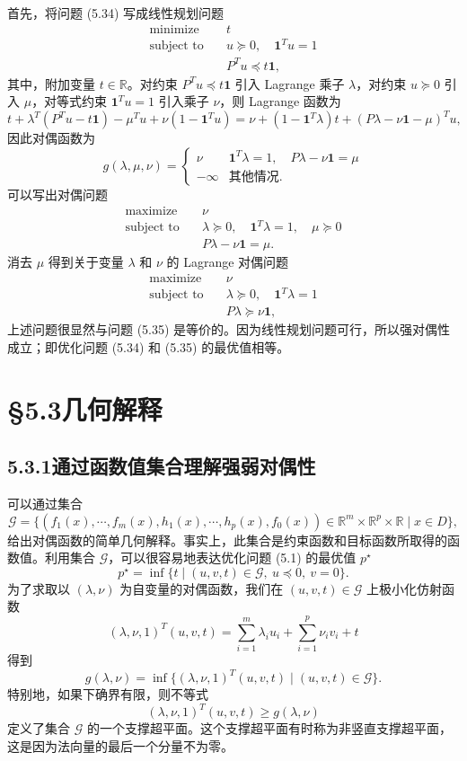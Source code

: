 \documentclass[UTF8, 12pt, fontset=fandol, oneside]{ctexart}
\begin{document}
首先，将问题 (5.34) 写成线性规划问题
\[
\begin{aligned}
\text{minimize}\quad & t\\
\text{subject to}\quad & u\succeq 0,\quad \mathbf{1}^Tu=1\\
& P^Tu\preceq t\mathbf{1},
\end{aligned}
\]
其中，附加变量 $t\in\mathbb{R}$。对约束 $P^Tu\preceq t\mathbf{1}$ 引入 Lagrange 乘子 $\lambda$，对约束 $u\succeq 0$ 引入 $\mu$，对等式约束 $\mathbf{1}^Tu=1$ 引入乘子 $\nu$，则 Lagrange 函数为
\[
t+\lambda^T(P^Tu-t\mathbf{1})-\mu^Tu+\nu(1-\mathbf{1}^Tu)
=\nu+(1-\mathbf{1}^T\lambda)t+(P\lambda-\nu\mathbf{1}-\mu)^Tu,
\]
因此对偶函数为
\[
g(\lambda,\mu,\nu)=
\begin{cases}
\nu & \mathbf{1}^T\lambda=1,\quad P\lambda-\nu\mathbf{1}=\mu\\
-\infty & \text{其他情况}.
\end{cases}
\]
可以写出对偶问题
\[
\begin{aligned}
\text{maximize}\quad & \nu\\
\text{subject to}\quad & \lambda\succeq 0,\quad \mathbf{1}^T\lambda=1,\quad \mu\succeq 0\\
& P\lambda-\nu\mathbf{1}=\mu.
\end{aligned}
\]
消去 $\mu$ 得到关于变量 $\lambda$ 和 $\nu$ 的 Lagrange 对偶问题
\[
\begin{aligned}
\text{maximize}\quad & \nu\\
\text{subject to}\quad & \lambda\succeq 0,\quad \mathbf{1}^T\lambda=1\\
& P\lambda\succeq \nu\mathbf{1},
\end{aligned}
\]
上述问题很显然与问题 (5.35) 是等价的。因为线性规划问题可行，所以强对偶性成立；即优化问题 (5.34) 和 (5.35) 的最优值相等。

\section*{§5.3\quad 几何解释}

\subsection*{5.3.1\quad 通过函数值集合理解强弱对偶性}

可以通过集合
\begin{equation}
\mathcal{G}=\{(f_1(x),\cdots,f_m(x),h_1(x),\cdots,h_p(x),f_0(x))\in\mathbb{R}^m\times\mathbb{R}^p\times\mathbb{R}\mid x\in D\},
\tag{5.36}
\end{equation}
给出对偶函数的简单几何解释。事实上，此集合是约束函数和目标函数所取得的函数值。利用集合 $\mathcal{G}$，可以很容易地表达优化问题 (5.1) 的最优值 $p^\star$
\[
p^\star=\inf\{t\mid (u,v,t)\in\mathcal{G},\ u\preceq 0,\ v=0\}.
\]
为了求取以 $(\lambda,\nu)$ 为自变量的对偶函数，我们在 $(u,v,t)\in\mathcal{G}$ 上极小化仿射函数
\[
(\lambda,\nu,1)^T(u,v,t)=\sum_{i=1}^m\lambda_i u_i+\sum_{i=1}^p\nu_i v_i+t
\]
得到
\[
g(\lambda,\nu)=\inf\{(\lambda,\nu,1)^T(u,v,t)\mid (u,v,t)\in\mathcal{G}\}.
\]
特别地，如果下确界有限，则不等式
\[
(\lambda,\nu,1)^T(u,v,t)\geq g(\lambda,\nu)
\]
定义了集合 $\mathcal{G}$ 的一个支撑超平面。这个支撑超平面有时称为非竖直支撑超平面，这是因为法向量的最后一个分量不为零。
\end{document}
